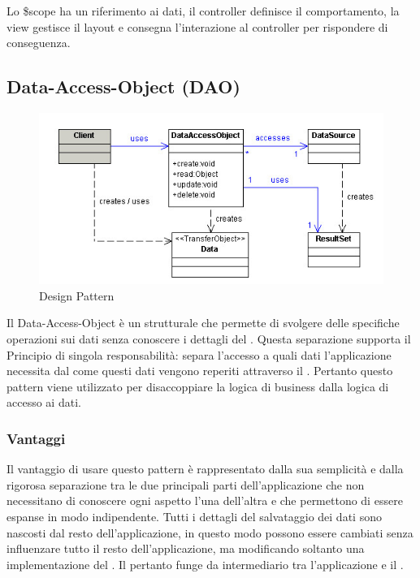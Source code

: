 \documentclass[a4paper, titlepage]{article}
\begin{document}
Lo \$scope ha un riferimento ai dati, il controller definisce il comportamento, la view gestisce il layout e consegna l’interazione al controller per rispondere di conseguenza.

\subsection{Data-Access-Object (DAO)}
\begin{figure}[htp]
\centering
\includegraphics[scale=0.75]{Img/dao.jpg}
\caption{Design Pattern }
\label{}
\end{figure}
Il Data-Access-Object è un  strutturale che permette di svolgere delle specifiche operazioni sui dati senza conoscere i dettagli del . Questa separazione supporta il Principio di singola responsabilità: separa l'accesso a quali dati l'applicazione necessita dal come questi dati vengono reperiti attraverso il .
Pertanto questo pattern viene utilizzato per disaccoppiare la logica di business dalla logica di accesso ai dati. 

\subsubsection{Vantaggi}
Il vantaggio di usare questo pattern è rappresentato dalla sua semplicità e dalla rigorosa separazione tra le due principali parti dell'applicazione che non necessitano di conoscere ogni aspetto l'una dell'altra e che permettono di essere espanse in modo indipendente.
Tutti i dettagli del salvataggio dei dati sono nascosti dal resto dell'applicazione, in questo modo possono essere cambiati senza influenzare tutto il resto dell'applicazione, ma modificando soltanto una implementazione del .
\newline Il  pertanto funge da intermediario tra l'applicazione e il .
\end{document}
